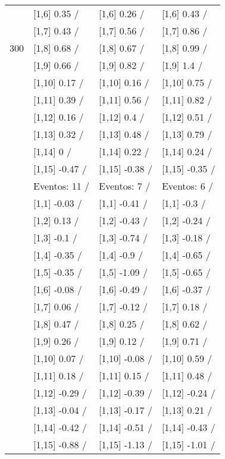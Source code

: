 \begin{table}
\begin{tabular}[t]{llll}
 & {}[1,6] 0.35  / & {}[1,6] 0.26  / & {}[1,6] 0.43  /\\
 & {}[1,7] 0.43  / & {}[1,7] 0.56  / & {}[1,7] 0.86  /\\
300 & {}[1,8] 0.68  / & {}[1,8] 0.67  / & {}[1,8] 0.99  /\\
\addlinespace
 & {}[1,9] 0.66  / & {}[1,9] 0.82  / & {}[1,9] 1.4  /\\
 & {}[1,10] 0.17  / & {}[1,10] 0.16  / & {}[1,10] 0.75  /\\
 & {}[1,11] 0.39  / & {}[1,11] 0.56  / & {}[1,11] 0.82  /\\
 & {}[1,12] 0.16  / & {}[1,12] 0.4  / & {}[1,12] 0.51  /\\
 & {}[1,13] 0.32  / & {}[1,13] 0.48  / & {}[1,13] 0.79  /\\
\addlinespace
 & {}[1,14] 0  / & {}[1,14] 0.22  / & {}[1,14] 0.24  /\\
 & {}[1,15] -0.47  / & {}[1,15] -0.38  / & {}[1,15] -0.35  /\\
 & Eventos:  11 / & Eventos:  7 / & Eventos:  6 /\\
 & {}[1,1] -0.03  / & {}[1,1] -0.41  / & {}[1,1] -0.3  /\\
 & {}[1,2] 0.13  / & {}[1,2] -0.43  / & {}[1,2] -0.24  /\\
\addlinespace
 & {}[1,3] -0.1  / & {}[1,3] -0.74  / & {}[1,3] -0.18  /\\
 & {}[1,4] -0.35  / & {}[1,4] -0.9  / & {}[1,4] -0.65  /\\
 & {}[1,5] -0.35  / & {}[1,5] -1.09  / & {}[1,5] -0.65  /\\
 & {}[1,6] -0.08  / & {}[1,6] -0.49  / & {}[1,6] -0.37  /\\
 & {}[1,7] 0.06  / & {}[1,7] -0.12  / & {}[1,7] 0.18  /\\
\addlinespace
500 & {}[1,8] 0.47  / & {}[1,8] 0.25  / & {}[1,8] 0.62  /\\
 & {}[1,9] 0.26  / & {}[1,9] 0.12  / & {}[1,9] 0.71  /\\
 & {}[1,10] 0.07  / & {}[1,10] -0.08  / & {}[1,10] 0.59  /\\
 & {}[1,11] 0.18  / & {}[1,11] 0.15  / & {}[1,11] 0.48  /\\
 & {}[1,12] -0.29  / & {}[1,12] -0.39  / & {}[1,12] -0.24  /\\
\addlinespace
 & {}[1,13] -0.04  / & {}[1,13] -0.17  / & {}[1,13] 0.21  /\\
 & {}[1,14] -0.42  / & {}[1,14] -0.51  / & {}[1,14] -0.43  /\\
 & {}[1,15] -0.88  / & {}[1,15] -1.13  / & {}[1,15] -1.01  /\\
\bottomrule
\end{tabular}
\end{table}
